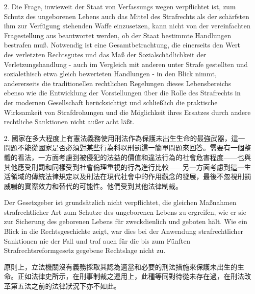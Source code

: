 \documentclass[12pt]{article}
\begin{document}
\syncleft
\begin{sourcepara}
2. Die Frage, inwieweit der Staat von Verfassungs wegen verpflichtet ist, zum Schutz des ungeborenen Lebens auch das Mittel des Strafrechts als der schärfsten ihm zur Verfügung stehenden Waffe einzusetzen, kann nicht von der vereinfachten Fragestellung aus beantwortet werden, ob der Staat bestimmte Handlungen bestrafen muß. Notwendig ist eine Gesamtbetrachtung, die einerseits den Wert des verletzten Rechtsgutes und das Maß der Sozialschädlichkeit der Verletzungshandlung - auch im Vergleich mit anderen unter Strafe gestellten und sozialethisch etwa gleich bewerteten Handlungen - in den Blick nimmt, andererseits die traditionellen rechtlichen Regelungen dieses Lebensbereichs ebenso wie die Entwicklung der Vorstellungen über die Rolle des Strafrechts in der modernen Gesellschaft berücksichtigt und schließlich die praktische Wirksamkeit von Strafdrohungen und die Möglichkeit ihres Ersatzes durch andere rechtliche Sanktionen nicht außer acht läßt.
\end{sourcepara}
\begin{transpara}
2. 國家在多大程度上有憲法義務使用刑法作為保護未出生生命的最強武器，這一問題不能從國家是否必須對某些行為科以刑罰這一簡單問題來回答。需要有一個整體的看法，一方面考慮到被侵犯的法益的價值和違法行為的社會危害程度——也與其他應受刑罰和同樣受到社會倫理重視的行為進行比較——另一方面考慮到這一生活領域的傳統法律規定以及刑法在現代社會中的作用觀念的發展，最後不忽視刑罰威嚇的實際效力和替代的可能性。他們受到其他法律制裁。
\end{transpara}

\syncleft
\begin{sourcepara}
Der Gesetzgeber ist grundsätzlich nicht verpflichtet, die gleichen Maßnahmen strafrechtlicher Art zum Schutze des ungeborenen Lebens zu ergreifen, wie er sie zur Sicherung des geborenen Lebens für zweckdienlich und geboten hält. Wie ein Blick in die Rechtsgeschichte zeigt, war dies bei der Anwendung strafrechtlicher Sanktionen nie der Fall und traf auch für die bis zum Fünften Strafrechtsreformgesetz gegebene Rechtslage nicht zu.
\end{sourcepara}
\begin{transpara}
原則上，立法機關沒有義務採取其認為適當和必要的刑法措施來保護未出生的生命。正如法律史所示，在刑事制裁之運用上，此種等同對待從未存在過，在刑法改革第五法之前的法律狀況下亦不如此。
\end{transpara}
\end{document}
